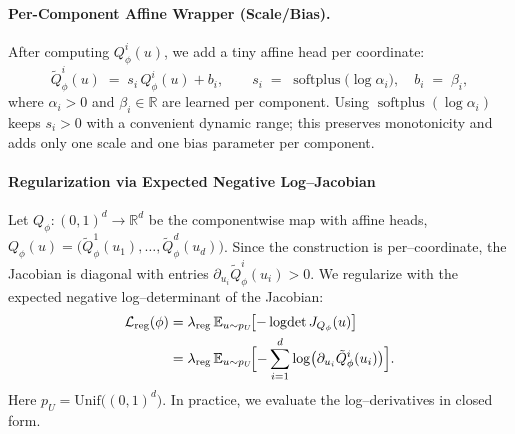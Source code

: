 \documentclass{article}
\theoremstyle{plain}
\theoremstyle{definition}
\theoremstyle{remark}
\begin{document}
{\paragraph{Per-Component Affine Wrapper (Scale/Bias).}
After computing \(Q^i_\phi(u)\), we add a tiny affine head per coordinate:
\[
\tilde Q^i_\phi(u) \;=\; s_i\, Q^i_\phi(u) + b_i,
\qquad
s_i \;=\; \operatorname{softplus}\!\bigl(\log \alpha_i\bigr), \quad
b_i \;=\; \beta_i,
\]
where \(\alpha_i>0\) and \(\beta_i\in\mathbb{R}\) are learned per component. Using \(\operatorname{softplus}(\log \alpha_i)\) keeps \(s_i>0\) with a convenient dynamic range; this preserves monotonicity and adds only one scale and one bias parameter per component.}

{\paragraph{Regularization via Expected Negative Log–Jacobian}\label{app:regularization}
Let \(Q_\phi:(0,1)^d\!\to\!\mathbb{R}^d\) be the componentwise map with affine heads, \(Q_\phi(u)=\bigl(\tilde Q^1_\phi(u_1),\dots,\tilde Q^d_\phi(u_d)\bigr)\).
Since the construction is per–coordinate, the Jacobian is diagonal with entries \(\partial_{u_i}\tilde Q^i_\phi(u_i)>0\).
We regularize with the expected negative log–determinant of the Jacobian:
\begin{align}\label{eq: log det reg}
\mathcal{L}_{\mathrm{reg}}(\phi)
&=\lambda_{\mathrm{reg}}\,
\mathbb{E}_{u\sim p_U}\!\bigl[
-\log\!\det J_{Q_\phi}(u)
\bigr] \\
&=\lambda_{\mathrm{reg}}\,
\mathbb{E}_{u\sim p_U}\!\Bigl[
-\sum_{i=1}^d \log \bigl(\partial_{u_i}\tilde Q^i_\phi(u_i)\bigr)
\Bigr].
\end{align}
Here \(p_U=\mathrm{Unif}\bigl((0,1)^d\bigr)\).
In practice, we evaluate the log–derivatives in closed form.}
\end{document}
